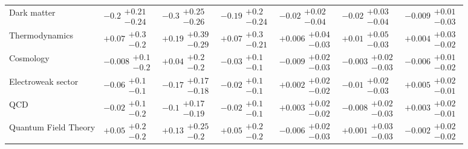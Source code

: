 \begin{table}[H]
\begin{tabular}{lllllll}
Dark matter & $-0.2\substack{+0.21 \\ -0.24}$ & $\bm{-0.3}\substack{+0.25 \\ -0.26}$ & $-0.19\substack{+0.2 \\ -0.24}$ & $-0.02\substack{+0.02 \\ -0.04}$ & $-0.02\substack{+0.03 \\ -0.04}$ & $-0.009\substack{+0.01 \\ -0.03}$ \\
Thermodynamics & $+0.07\substack{+0.3 \\ -0.2}$ & $+0.19\substack{+0.39 \\ -0.29}$ & $+0.07\substack{+0.3 \\ -0.21}$ & $+0.006\substack{+0.04 \\ -0.03}$ & $+0.01\substack{+0.05 \\ -0.03}$ & $+0.004\substack{+0.03 \\ -0.02}$ \\
Cosmology & $-0.008\substack{+0.1 \\ -0.2}$ & $+0.04\substack{+0.2 \\ -0.2}$ & $-0.03\substack{+0.1 \\ -0.1}$ & $-0.009\substack{+0.02 \\ -0.03}$ & $-0.003\substack{+0.02 \\ -0.03}$ & $-0.006\substack{+0.01 \\ -0.02}$ \\
Electroweak sector & $-0.06\substack{+0.1 \\ -0.1}$ & $-0.17\substack{+0.17 \\ -0.18}$ & $-0.02\substack{+0.1 \\ -0.1}$ & $+0.002\substack{+0.02 \\ -0.02}$ & $-0.01\substack{+0.02 \\ -0.03}$ & $+0.005\substack{+0.02 \\ -0.01}$ \\
QCD & $-0.02\substack{+0.1 \\ -0.2}$ & $-0.1\substack{+0.17 \\ -0.19}$ & $-0.02\substack{+0.1 \\ -0.1}$ & $+0.003\substack{+0.02 \\ -0.02}$ & $-0.008\substack{+0.02 \\ -0.03}$ & $+0.003\substack{+0.02 \\ -0.01}$ \\
Quantum Field Theory & $+0.05\substack{+0.2 \\ -0.2}$ & $+0.13\substack{+0.25 \\ -0.2}$ & $+0.05\substack{+0.2 \\ -0.2}$ & $-0.006\substack{+0.02 \\ -0.03}$ & $+0.001\substack{+0.03 \\ -0.03}$ & $-0.002\substack{+0.02 \\ -0.02}$ \\

\end{tabular}
\end{table}
